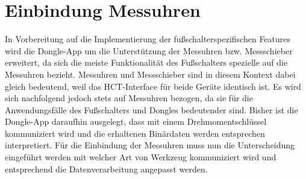 \section{Einbindung Messuhren}
In Vorbereitung auf die Implementierung der fußschalterspezifischen Features wird die Dongle-App um die Unterstützung der Messuhren bzw. Messschieber erweitert, da sich die meiste Funktionalität des Fußschalters spezielle auf die Messuhren bezieht. Messuhren und Messschieber sind in diesem Kontext dabei gleich bedeutend, weil das HCT-Interface für beide Geräte identisch ist. Es wird sich nachfolgend jedoch stets auf Messuhren bezogen, da sie für die Anwendungsfälle des Fußschalters und Dongles bedeutender sind. Bisher ist die Dongle-App daraufhin ausgelegt, dass mit einem Drehmomentschlüssel kommuniziert wird und die erhaltenen Binärdaten werden entsprechen interpretiert. Für die Einbindung der Messuhren muss nun die Unterscheidung eingeführt werden mit welcher Art von Werkzeug kommuniziert wird und entsprechend die Datenverarbeitung angepasst werden.

